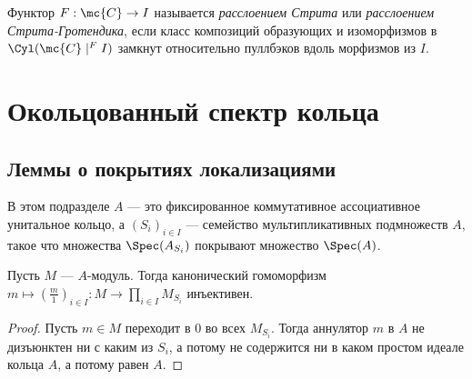 \documentclass[
	extrafontsizes,
	11pt,
	hyphens,
]{memoir}
\begin{document}
\begin{definition}
Функтор \(F : \mc{C} \to I\) называется \emph{расслоением Стрита} или \emph{расслоением Стрита-Гротендика}, если класс композиций образующих и изоморфизмов в \(\Cyl(\mc{C} \mid^F I)\) замкнут относительно пуллбэков вдоль морфизмов из \(I\).
\end{definition}


\section{Окольцованный спектр кольца}

\subsection{Леммы о покрытиях локализациями}

\begin{convention}
В этом подразделе \(A\) --- это фиксированное коммутативное ассоциативное унитальное кольцо, а \((S_i)_{i \in I}\) --- семейство мультипликативных подмножеств \(A\), такое что множества \(\Spec(A_{S_i})\) покрывают множество \(\Spec(A)\).
\end{convention}


\begin{lemma} \label{lem:LocCoverInj}
Пусть \(M\) --- \(A\)-мо\-дуль.
Тогда канонический гомоморфизм
\(m \mapsto (\frac{m}{1})_{i \in I} : M \to \prod_{i \in I} M_{S_i}\)
инъективен.
\end{lemma}

\begin{proof}
Пусть \(m \in M\) переходит в \(0\) во всех \(M_{S_i}\). Тогда аннулятор \(m\) в \(A\) не дизъюнктен ни с каким из \(S_i\), а потому не содержится ни в каком простом идеале кольца \(A\), а потому равен \(A\). 
\end{proof}

\end{document}
